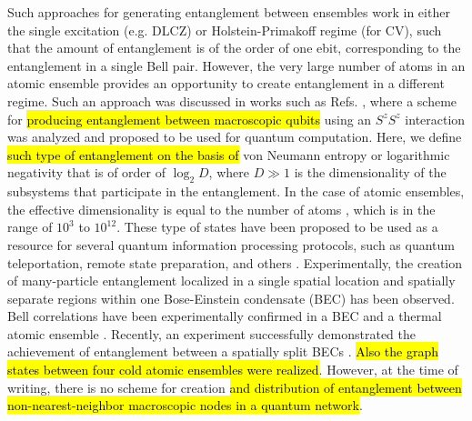 \documentclass{WileyMSP-template}
\begin{document}
Such approaches for generating entanglement between ensembles work in either the single excitation  (e.g.  DLCZ) or Holstein-Primakoff regime (for CV), such that the amount of entanglement is of the order of one ebit, corresponding to the entanglement in a single Bell pair.  However, the very large number of atoms in an atomic ensemble provides an opportunity to create entanglement in a different regime.%
Such an approach was discussed in works such as Refs. \cite{byrnes2013fractality,pyrkov2013entanglement,rosseau2014,byrnes2012macroscopic,hussain2014geometric}, where a scheme for \hl{producing entanglement between macroscopic qubits} using an $ S^z S^z$ interaction was analyzed and proposed to be used for quantum computation. Here, we define \hl{such type of entanglement on the basis of} von Neumann entropy or logarithmic negativity that is of order of $ \log_2 D $, where $ D \gg 1  $ is the dimensionality of the subsystems that participate in the entanglement.  In the case of atomic ensembles, the effective dimensionality is equal to the number of atoms \cite{byrnes2020quantum}, which is in the range of $ 10^3 $ to $ 10^{12} $.   These type of states have been proposed to be used as a resource for several quantum information processing protocols, such as quantum teleportation, remote state preparation, and others \cite{pyrkov2014full,byrnes2015macroscopic,manish2021,byrnes2011accelerated}. Experimentally,
the creation of many-particle entanglement localized in a single spatial location \cite{schmied2016bell} and spatially separate regions \cite{fadel2018spatial} within one Bose-Einstein condensate (BEC) has been observed.
Bell correlations have been experimentally confirmed in a BEC \cite{schmied2016bell} and a thermal atomic ensemble \cite{engelsen2017}. Recently, an experiment successfully demonstrated the achievement of entanglement between a spatially split BECs \cite{Colciaghi2023}. \hl{Also the graph states between four cold atomic ensembles were realized}\cite{cooper24}. However, at the time of writing, there is no scheme for creation \hl{and distribution of  entanglement between non-nearest-neighbor macroscopic nodes in a quantum network}.
\end{document}
